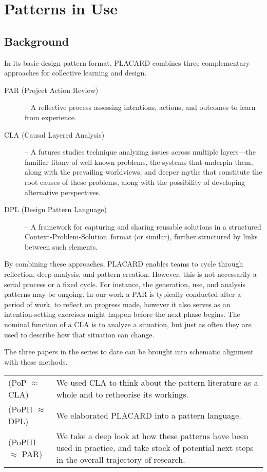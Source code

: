 \documentclass[acmlarge,timestamp]{acmart}
\begin{document}
\section{Patterns in Use}\label{sec:II}

\subsection{Background}

In its basic design pattern format, PLACARD combines three
complementary approaches for collective learning and design.

\begin{description}
\item[PAR (Project Action Review)] -- A reflective process assessing
  intentions, actions, and outcomes to learn from experience.
\item[CLA (Causal Layered Analysis)] -- A futures studies technique
  analyzing issues across multiple layers---the familiar litany of
  well-known problems, the systems that underpin them, along with the
  prevailing worldviews, and deeper myths that constitute the root
  causes of these problems, along with the possibility of developing
  alternative perspectives.
\item[DPL (Design Pattern Language)] -- A framework for capturing and
  sharing reusable solutions in a structured
  Context-Problem-Solution~format (or similar), further structured by
  links between such elements.
\end{description}

By combining these approaches, PLACARD enables teams to cycle
through reflection, deep analysis, and pattern
creation.  However, this is not necessarily a serial process or
a fixed cycle.  For instance, the generation, use, and analysis
patterns may be ongoing.  In our work a PAR is typically
conducted after a period of work, to reflect on progress made,
however it also serves as an intention-setting exercises might
happen before the next phase begins.  The nominal function of a
CLA is to analyze a situation, but just as often they are used
to describe how that situation can change.

The three papers in the series to date can be brought into schematic alignment with these methods.

\medskip
\begin{tabular}{lp{}}
(PoP $\approx$ CLA) &We used CLA to think about the pattern literature as a whole and to retheorise its workings.\\
(PoPII $\approx$ DPL)& We elaborated PLACARD into a pattern language.\\
(PoPIII $\approx$ PAR)& We take a deep look at how these patterns have been used in practice, and take stock of potential next steps in the overall trajectory of research.\\
\end{tabular}
\end{document}
